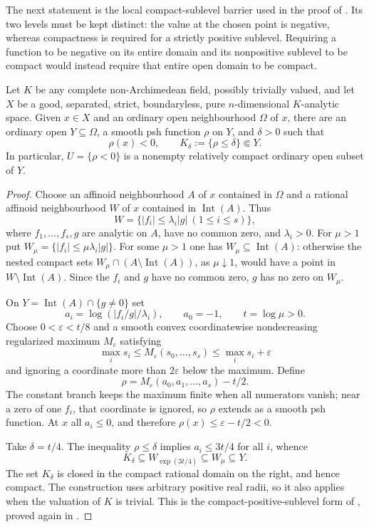 The next statement is the local compact-sublevel barrier used in the proof of
.  Its two levels must be kept
distinct: the value at the chosen point is negative, whereas compactness is
required for a strictly positive sublevel.  Requiring a function to be
negative on its entire domain and its nonpositive sublevel to be compact
would instead require that entire open domain to be compact.

\begin{proposition}
\label{prop:ch15-exhaustion}
Let $K$ be any complete non-Archimedean field, possibly trivially valued,
and let $X$ be a good, separated, strict, boundaryless, pure
$n$-dimensional $K$-analytic space.  Given $x\in X$ and an ordinary open
neighbourhood $\Omega$ of $x$, there are an ordinary open
$Y\subseteq\Omega$, a smooth psh function $\rho$ on $Y$, and $\delta>0$
such that
\[
             \rho(x)<0,
 \qquad K_\delta:=\{\rho\leq\delta\}\Subset Y.
\]
In particular, $U=\{\rho<0\}$ is a nonempty relatively compact ordinary
open subset of $Y$.
\end{proposition}

\begin{proof}
Choose an affinoid neighbourhood $A$ of $x$ contained in $\Omega$ and a
rational affinoid neighbourhood $W$ of $x$ contained in
$\operatorname{Int}(A)$.  Thus
\[
 W=\bigl\{|f_i|\leq\lambda_i|g|\ (1\leq i\leq s)\bigr\},
\]
where $f_1,\ldots,f_s,g$ are analytic on $A$, have no common zero, and
$\lambda_i>0$.  For $\mu>1$ put
$W_\mu=\{|f_i|\leq\mu\lambda_i|g|\}$.  For some $\mu>1$ one has
$W_\mu\subseteq\operatorname{Int}(A)$: otherwise the nested compact sets
$W_\mu\cap(A\setminus\operatorname{Int}(A))$, as $\mu\downarrow1$, would
have a point in $W\setminus\operatorname{Int}(A)$.  Since the $f_i$ and $g$
have no common zero, $g$ has no zero on $W_\mu$.

On $Y=\operatorname{Int}(A)\cap\{g\ne0\}$ set
\[
 a_i=\log(|f_i/g|/\lambda_i),\qquad a_0=-1,
 \qquad t=\log\mu>0.
\]
Choose $0<\varepsilon<t/8$ and a smooth convex coordinatewise
nondecreasing regularized maximum $M_\varepsilon$ satisfying
\[
 \max_i s_i\leq M_\varepsilon(s_0,\ldots,s_s)
       \leq\max_i s_i+\varepsilon
\]
and ignoring a coordinate more than $2\varepsilon$ below the maximum.
Define
\[
             \rho=M_\varepsilon(a_0,a_1,\ldots,a_s)-t/2.
\]
The constant branch keeps the maximum finite when all numerators vanish;
near a zero of one $f_i$, that coordinate is ignored, so $\rho$ extends as
a smooth psh function.  At $x$ all $a_i\leq0$, and therefore
$\rho(x)\leq\varepsilon-t/2<0$.

Take $\delta=t/4$.  The inequality $\rho\leq\delta$ implies
$a_i\leq3t/4$ for all $i$, whence
\[
 K_\delta\subseteq W_{\exp(3t/4)}\subseteq W_\mu\subseteq Y.
\]
The set $K_\delta$ is closed in the compact rational domain on the right,
and hence compact.  The construction uses arbitrary positive real radii,
so it also applies when the valuation of $K$ is trivial.  This is the
compact-positive-sublevel form of
\cite[Proposition~16.9.1]{CLD25}, proved again in
.
\end{proof}


